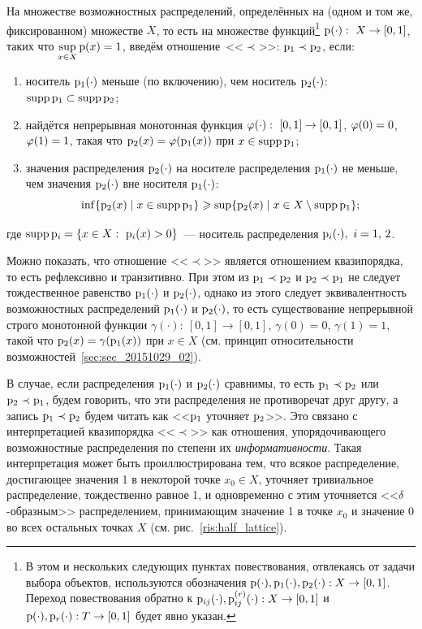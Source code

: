 На множестве возможностных распределений, определённых на (одном и том же, фиксированном) множестве $X$, то есть на множестве функций\footnote{В этом и нескольких следующих пунктах повествования, отвлекаясь от задачи выбора объектов, используются обозначения ${\mathrm{p}}(\cdot), {\mathrm{p}}_1(\cdot), {\mathrm{p}}_2(\cdot): X\to [0,1]$. Переход повествования обратно к ${\mathrm{p}}_{ij}(\cdot),{\mathrm{p}}_{ij}^{(r)}(\cdot): X\to [0,1] $ и ${\mathrm{p}}(\cdot),{\mathrm{p}}_{r}(\cdot): T\to [0,1] $ будет явно указан.} ${\mathrm{p}}(\cdot):\ X\to[0,1]$, таких что $\displaystyle \sup_{x\in X} {\mathrm{p}}(x) = 1$, введём отношение~<<$\prec$>>: ${\mathrm{p}}_1\prec{\mathrm{p}}_2$, если:
\begin{enumerate}
    \item\label{order-D1}
        носитель ${\mathrm{p}}_1(\cdot)$ меньше (по включению), чем носитель ${\mathrm{p}}_2(\cdot)$: ${\mathrm{supp}}\,{\mathrm{p}}_1\subset{\mathrm{supp}}\,{\mathrm{p}}_2$;
    \item\label{order-D2}
        найдётся непрерывная монотонная функция ${\mygamma(\cdot):\ [0,1]\to[0,1]}$, $\varphi(0) = 0$, $\varphi(1) = 1$, такая что ${\mathrm{p}}_2(x) = \varphi({\mathrm{p}}_1(x))$ при $x\in{\mathrm{supp}}\,{\mathrm{p}}_1$;
    \item\label{order-D3}
        значения распределения ${\mathrm{p}}_2(\cdot)$ на носителе распределения ${\mathrm{p}}_1(\cdot)$ не меньше, чем значения ${\mathrm{p}}_2(\cdot)$ вне носителя ${\mathrm{p}}_1(\cdot)$:
        $$\inf\{{\mathrm{p}}_2(x) \mid x\in{\mathrm{supp}}\,{\mathrm{p}}_1\} \geqslant \sup\{{\mathrm{p}}_2(x) \mid x\in X\setminus{\mathrm{supp}}\,{\mathrm{p}}_1\};$$
\end{enumerate}
где ${\mathrm{supp}}\, {\mathrm{p}}_i = \{x\in X:\ {\mathrm{p}}_i(x) > 0\}$~--- носитель распределения ${\mathrm{p}}_i(\cdot),\ i=1,\, 2$.

Можно показать, что отношение <<$\prec$>> является отношением квазипорядка, то есть рефлексивно и транзитивно. При этом из ${\mathrm{p}}_1\prec{\mathrm{p}}_2$ и ${\mathrm{p}}_2\prec{\mathrm{p}}_1$ не следует тождественное равенство ${\mathrm{p}}_1(\cdot)$ и ${\mathrm{p}}_2(\cdot)$, однако из этого следует эквивалентность возможностных распределений ${\mathrm{p}}_1(\cdot)$ и ${\mathrm{p}}_2(\cdot)$, то есть существование непрерывной строго монотонной функции $\gamma (\cdot):\ [0,1]\to[0,1]$, $\gamma(0) = 0$, $\gamma(1) = 1$, такой что ${\mathrm{p}}_2(x) = \gamma({\mathrm{p}}_1(x))$ при $x\in X$ (см. принцип относительности возможностей~\ref{sec:sec_20151029_02}).

В случае, если распределения ${\mathrm{p}}_1(\cdot)$ и ${\mathrm{p}}_2(\cdot)$ сравнимы, то есть ${\mathrm{p}}_1\prec{\mathrm{p}}_2$ или ${\mathrm{p}}_2\prec{\mathrm{p}}_1$, будем говорить, что эти распределения не противоречат друг другу, а запись ${\mathrm{p}}_1\prec{\mathrm{p}}_2$ будем читать как <<${\mathrm{p}}_1$ уточняет ${\mathrm{p}}_2$>>. Это связано с интерпретацией квазипорядка <<$\prec$>> как отношения, упорядочивающего возможностные распределения по степени их \emph{информативности}. Такая интерпретация может быть проиллюстрирована тем, что всякое распределение, достигающее значения 1 в некоторой точке $x_0 \in X$, уточняет тривиальное распределение, тождественно равное 1, и одновременно с этим уточняется <<$\delta$-образным>> распределением, принимающим значение 1 в точке $x_0$ и значение 0 во всех остальных точках $X$ (см. рис.~\ref{ris:half_lattice}).

